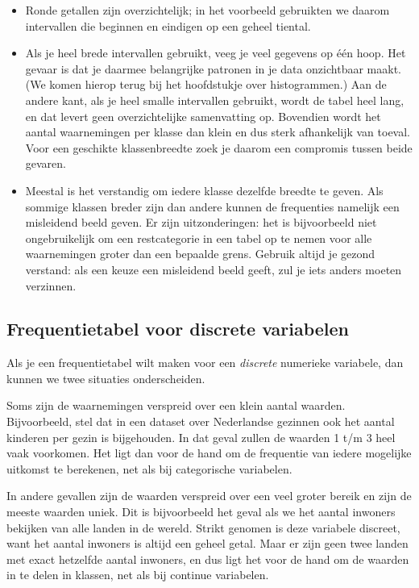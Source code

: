 \documentclass[
  a4paper,
]{scrbook}
\providecommand{\tightlist}{%
  \setlength{\itemsep}{0pt}\setlength{\parskip}{0pt}}\usepackage{longtable,booktabs,array}
\theoremstyle{definition}
\theoremstyle{definition}
\theoremstyle{remark}
\begin{document}
\begin{itemize}
\tightlist
\item
  Ronde getallen zijn overzichtelijk; in het voorbeeld gebruikten we
  daarom intervallen die beginnen en eindigen op een geheel tiental.
\item
  Als je heel brede intervallen gebruikt, veeg je veel gegevens op één
  hoop. Het gevaar is dat je daarmee belangrijke patronen in je data
  onzichtbaar maakt. (We komen hierop terug bij het hoofdstukje over
  histogrammen.) Aan de andere kant, als je heel smalle intervallen
  gebruikt, wordt de tabel heel lang, en dat levert geen overzichtelijke
  samenvatting op. Bovendien wordt het aantal waarnemingen per klasse
  dan klein en dus sterk afhankelijk van toeval. Voor een geschikte
  klassenbreedte zoek je daarom een compromis tussen beide gevaren.
\item
  Meestal is het verstandig om iedere klasse dezelfde breedte te geven.
  Als sommige klassen breder zijn dan andere kunnen de frequenties
  namelijk een misleidend beeld geven. Er zijn uitzonderingen: het is
  bijvoorbeeld niet ongebruikelijk om een restcategorie in een tabel op
  te nemen voor alle waarnemingen groter dan een bepaalde grens. Gebruik
  altijd je gezond verstand: als een keuze een misleidend beeld geeft,
  zul je iets anders moeten verzinnen.
\end{itemize}

\subsection{Frequentietabel voor discrete
variabelen}\label{frequentietabel-voor-discrete-variabelen}

Als je een frequentietabel wilt maken voor een \emph{discrete} numerieke
variabele, dan kunnen we twee situaties onderscheiden.

Soms zijn de waarnemingen verspreid over een klein aantal waarden.
Bijvoorbeeld, stel dat in een dataset over Nederlandse gezinnen ook het
aantal kinderen per gezin is bijgehouden. In dat geval zullen de waarden
1 t/m 3 heel vaak voorkomen. Het ligt dan voor de hand om de frequentie
van iedere mogelijke uitkomst te berekenen, net als bij categorische
variabelen.

In andere gevallen zijn de waarden verspreid over een veel groter bereik
en zijn de meeste waarden uniek. Dit is bijvoorbeeld het geval als we
het aantal inwoners bekijken van alle landen in de wereld. Strikt
genomen is deze variabele discreet, want het aantal inwoners is altijd
een geheel getal. Maar er zijn geen twee landen met exact hetzelfde
aantal inwoners, en dus ligt het voor de hand om de waarden in te delen
in klassen, net als bij continue variabelen.
\end{document}
